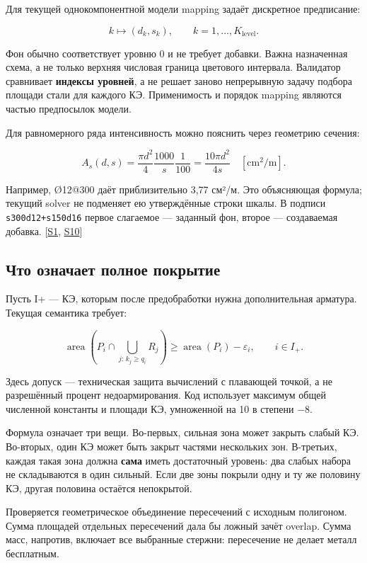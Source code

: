 \documentclass[11pt,a4paper]{article}
\begin{document}
Для текущей однокомпонентной модели mapping задаёт дискретное предписание:


\[
k\longmapsto (d_k,s_k),\qquad k=1,\ldots,K_{\mathrm{level}}.
\]

Фон обычно соответствует уровню 0 и не требует добавки. Важна назначенная схема, а не только верхняя числовая граница цветового интервала. Валидатор сравнивает \textbf{индексы уровней}, а не решает заново непрерывную задачу подбора площади стали для каждого КЭ. Применимость и порядок mapping являются частью предпосылок модели.


Для равномерного ряда интенсивность можно пояснить через геометрию сечения:


\[
A_s(d,s)=\frac{\pi d^2}{4}\frac{1000}{s}\frac{1}{100}
=\frac{10\pi d^2}{4s}\quad[\mathrm{cm^2/m}].
\]

Например, Ø12@300 даёт приблизительно 3,77 см²/м. Это объясняющая формула; текущий solver не подменяет ею утверждённые строки шкалы. В подписи {\small\nolinkurl{s300d12+s150d16}} первое слагаемое — заданный фон, второе — создаваемая добавка. {\color{Teal}\small[\hyperlink{S1}{S1}, \hyperlink{S10}{S10}]}


\subsection{Что означает полное покрытие}

Пусть I+ — КЭ, которым после предобработки нужна дополнительная арматура. Текущая семантика требует:


\[
\operatorname{area}\!\left(
P_i\cap\bigcup_{j:\,k_j\ge q_i}R_j
\right)\ge\operatorname{area}(P_i)-\varepsilon_i,
\qquad i\in I_+.
\]

Здесь допуск — техническая защита вычислений с плавающей точкой, а не разрешённый процент недоармирования. Код использует максимум общей численной константы и площади КЭ, умноженной на 10 в степени −8.


Формула означает три вещи. Во-первых, сильная зона может закрыть слабый КЭ. Во-вторых, один КЭ может быть закрыт частями нескольких зон. В-третьих, каждая такая зона должна \textbf{сама} иметь достаточный уровень: два слабых набора не складываются в один сильный. Если две зоны покрыли одну и ту же половину КЭ, другая половина остаётся непокрытой.


Проверяется геометрическое объединение пересечений с исходным полигоном. Сумма площадей отдельных пересечений дала бы ложный зачёт overlap. Сумма масс, напротив, включает все выбранные стержни: пересечение не делает металл бесплатным.
\end{document}
